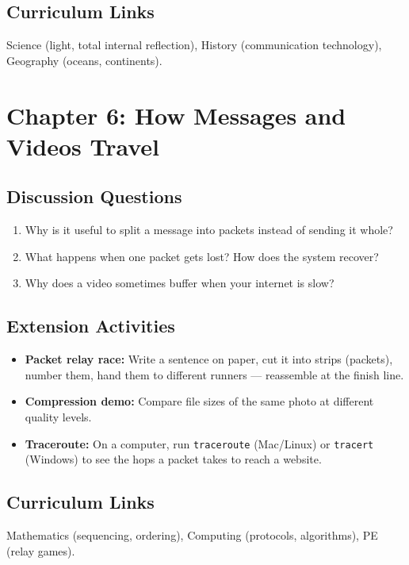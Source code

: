 \subsection*{Curriculum Links}
Science (light, total internal reflection), History (communication technology), Geography (oceans, continents).

\sectionrule

\section*{Chapter 6: How Messages and Videos Travel}

\subsection*{Discussion Questions}
\begin{enumerate}
  \item Why is it useful to split a message into packets instead of sending it whole?
  \item What happens when one packet gets lost? How does the system recover?
  \item Why does a video sometimes buffer when your internet is slow?
\end{enumerate}

\subsection*{Extension Activities}
\begin{itemize}
  \item \textbf{Packet relay race:} Write a sentence on paper, cut it into strips (packets), number them, hand them to different runners — reassemble at the finish line.
  \item \textbf{Compression demo:} Compare file sizes of the same photo at different quality levels.
  \item \textbf{Traceroute:} On a computer, run \texttt{traceroute} (Mac/Linux) or \texttt{tracert} (Windows) to see the hops a packet takes to reach a website.
\end{itemize}

\subsection*{Curriculum Links}
Mathematics (sequencing, ordering), Computing (protocols, algorithms), PE (relay games).

